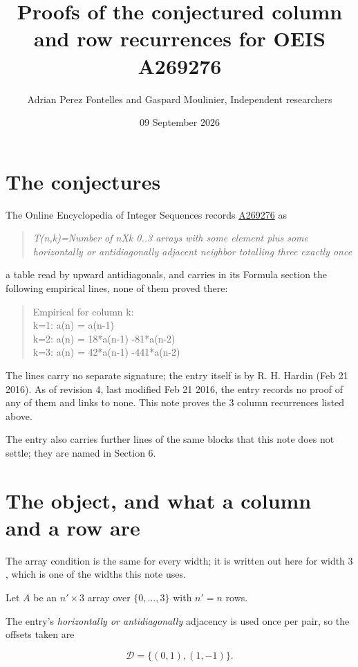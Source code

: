 \documentclass[11pt]{article}
\title{Proofs of the conjectured column and row recurrences for OEIS A269276}
\author{Adrian Perez Fontelles and Gaspard Moulinier, Independent researchers}
\date{09 September 2026}
\theoremstyle{definition}
\begin{document}
\maketitle
\section{The conjectures}

The Online Encyclopedia of Integer Sequences records \href{https://oeis.org/A269276}{A269276} as

\begin{quote}\itshape T(n,k)=Number of nXk 0..3 arrays with some element plus some horizontally or antidiagonally adjacent neighbor totalling three exactly once\end{quote}

a table read by upward antidiagonals, and carries in its Formula section the following empirical lines, none of them proved there:

\begin{quote}\ttfamily Empirical for column k:\\
k=1: a(n) = a(n-1)\\k=2: a(n) = 18*a(n-1) -81*a(n-2)\\k=3: a(n) = 42*a(n-1) -441*a(n-2)\end{quote}

The lines carry no separate signature; the entry itself is by R. H. Hardin (Feb 21 2016). As of revision 4, last modified Feb 21 2016, the entry records no proof of any of them and links to none. This note proves the 3 column recurrences listed above.

The entry also carries further lines of the same blocks that this note does not settle; they are named in Section 6.

\section{The object, and what a column and a row are}

The array condition is the same for every width; it is written out here for width $3$, which is one of the widths this note uses.

Let $A$ be an $n' \times 3$ array over $\{0,\dots,3\}$ with $n' = n$ rows.

The entry's {\itshape horizontally or antidiagonally} adjacency is used once per pair, so the offsets taken are

\[\mathcal{D} = \{(0,1), (1,-1)\}.\]
\end{document}
